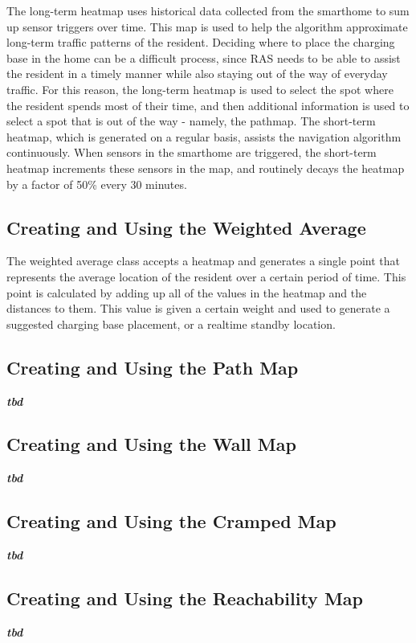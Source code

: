 \documentclass[11pt, conference, a4paper]{IEEEtran}
\begin{document}
The long-term heatmap uses historical data collected from the smarthome to sum up sensor triggers over time. This map is used to help the algorithm approximate long-term traffic patterns of the resident. Deciding where to place the charging base in the home can be a difficult process, since RAS needs to be able to assist the resident in a timely manner while also staying out of the way of everyday traffic. For this reason, the long-term heatmap is used to select the spot where the resident spends most of their time, and then additional information is used to select a spot that is out of the way - namely, the pathmap. 
The short-term heatmap, which is generated on a regular basis, assists the navigation algorithm continuously. When sensors in the smarthome are triggered, the short-term heatmap increments these sensors in the map, and routinely decays the heatmap by a factor of 50\% every 30 minutes. 


\subsection{Creating and Using the Weighted Average}
The weighted average class accepts a heatmap and generates a single point that represents the average location of the resident over a certain period of time. This point is calculated by adding up all of the values in the heatmap and the distances to them. This value is given a certain weight and used to generate a suggested charging base placement, or a realtime standby location.         


\subsection{Creating and Using the Path Map}
\textit{\textbf{tbd}}


\subsection{Creating and Using the Wall Map}
\textit{\textbf{tbd}}


\subsection{Creating and Using the Cramped Map}
\textit{\textbf{tbd}}

\subsection{Creating and Using the Reachability Map}
\textit{\textbf{tbd}} 
\end{document}
